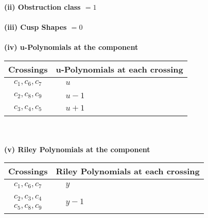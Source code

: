 \documentclass[1p]{elsarticle_modified}
\theoremstyle{definition}
\begin{document}
\flushleft \textbf{(ii) Obstruction class $= 1$}\\~\\
\flushleft \textbf{(iii) Cusp Shapes $= 0$}\\~\\
\newpage\renewcommand{\arraystretch}{1}
\flushleft \textbf{(iv) u-Polynomials at the component}\newline \\
\begin{tabular}{m{50pt}|m{274pt}}
Crossings & \hspace{64pt}u-Polynomials at each crossing \\
\hline $$\begin{aligned}c_{1},c_{6},c_{7}\end{aligned}$$&$\begin{aligned}
&u
\end{aligned}$\\
\hline $$\begin{aligned}c_{2},c_{8},c_{9}\end{aligned}$$&$\begin{aligned}
&u-1
\end{aligned}$\\
\hline $$\begin{aligned}c_{3},c_{4},c_{5}\end{aligned}$$&$\begin{aligned}
&u+1
\end{aligned}$\\
\hline
\end{tabular}\\~\\
\newpage\renewcommand{\arraystretch}{1}
\flushleft \textbf{(v) Riley Polynomials at the component}\newline \\
\begin{tabular}{m{50pt}|m{274pt}}
Crossings & \hspace{64pt}Riley Polynomials at each crossing \\
\hline $$\begin{aligned}c_{1},c_{6},c_{7}\end{aligned}$$&$\begin{aligned}
&y
\end{aligned}$\\
\hline $$\begin{aligned}c_{2},c_{3},c_{4}\\c_{5},c_{8},c_{9}\end{aligned}$$&$\begin{aligned}
&y-1
\end{aligned}$\\
\hline
\end{tabular}\\~\\
\end{document}
